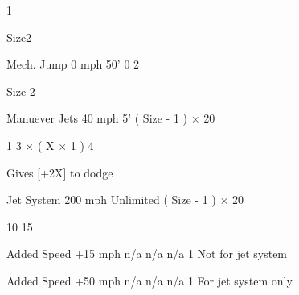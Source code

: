 \documentclass[twoside]{book}
\begin{document}
                       1   
                      
                        
                          
                            Size2
                          
                        
                        
                      
                      
                       Mech. Jump   
                       0 mph   
                       50'   
                       0   
                       2   
                      
                           Size  2 
                          
                        
                      
                      
                       Manuever Jets   
                       40 mph   
                       5'   
                             (    Size  
                          -    1    )   
                         \ensuremath{\times}    20   
                        
                       1   
                               3 
                         \ensuremath{\times}    (    X  
                          \ensuremath{\times}    1    )
                              4  
                         
                        
                       Gives [+2X] to dodge   
                      
                      
                       Jet System   
                       200 mph   
                       Unlimited   
                             (    Size  
                          -    1    )   
                         \ensuremath{\times}    20   
                        
                       10   
                       15   
                      
                      
                       Added Speed   
                       +15 mph   
                       n/a   
                       n/a   
                       n/a   
                       1   
                       Not for jet system   
                      
                      
                       Added Speed   
                       +50 mph   
                       n/a   
                       n/a   
                       n/a   
                       1   
                       For jet system only   
                      
\end{document}

